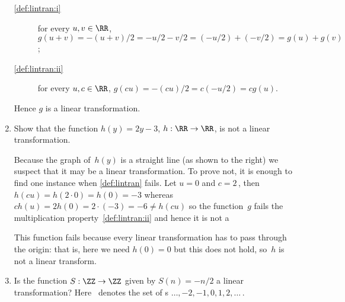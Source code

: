 \begin{example}[1D cases]
\begin{enumerate}
\begin{solution}
\begin{figbox}{}
\end{figbox}
\begin{description}
\item[\cref{def:lintran:i}] for every \(u,v\in\RR\), \(g(u+v)=-(u+v)/2=-u/2-v/2=(-u/2)+(-v/2)=g(u)+g(v)\);
\item[\cref{def:lintran:ii}] for every \(u,c\in\RR\), \(g(cu)=-(cu)/2=c(-u/2)=cg(u)\).
\end{description}
Hence \(g\) is a linear transformation.
\end{solution}



\item 
\begin{figbox}{}%
Show that the function \(h(y)=2y-3\), \(h:\RR\to\RR\), is not a linear transformation.

\begin{solution} 
Because the graph of~\(h(y)\) is a straight line (as shown to the right) we suspect that it may be a linear transformation.
To prove not, it is enough to find one instance when \cref{def:lintran} fails. 
Let \(u=0\) and \(c=2\)\,, then \(h(cu)=h(2\cdot0)=h(0)=-3\) whereas \(ch(u)=2h(0)=2\cdot(-3)=-6\neq h(cu)\) so the function~\(g\) fails the multiplication property~\ref{def:lintran:ii} and hence it is not a 

This function fails because every linear transformation has to pass through the origin: that is, here we need \(h(0)=0\) but this does not hold, so~\(h\) is not a linear transform.
\end{solution}
\end{figbox}


\item 
\begin{figbox}{}%
Is the function \(S:\ZZ\to\ZZ\) given by \(S(n)=-n/2\) a linear transformation?  Here \ZZ~denotes the set of s \(\ldots,-2,-1,0,1,2,\ldots\)\,.
\vspace{1ex}
\end{figbox}


\end{enumerate}
\end{example}
